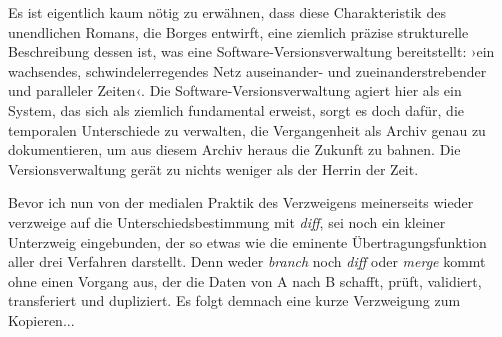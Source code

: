 \documentclass[a4paper,11pt]{article}
\newcommand{\inanf}[1]{›#1‹}
\begin{document}
Es ist eigentlich kaum nötig zu erwähnen, dass diese Charakteristik des unendlichen Romans, die Borges entwirft, eine ziemlich präzise strukturelle Beschreibung dessen ist, was eine Software-Versionsverwaltung bereitstellt: \inanf{ein wachsendes, schwindelerregendes Netz auseinander- und zueinanderstrebender und paralleler Zeiten}. Die Software-Versionsverwaltung agiert hier als ein System, das sich als ziemlich fundamental erweist, sorgt es doch dafür, die temporalen Unterschiede zu verwalten, die Vergangenheit als Archiv genau zu dokumentieren, um aus diesem Archiv heraus die Zukunft zu bahnen. Die Versionsverwaltung gerät zu nichts weniger als der Herrin der Zeit.

Bevor ich nun von der medialen Praktik des Verzweigens meinerseits wieder verzweige auf die Unterschiedsbestimmung mit \emph{diff}, sei noch ein kleiner Unterzweig eingebunden, der so etwas wie die eminente Übertragungsfunktion aller drei Verfahren darstellt. Denn weder \emph{branch} noch \emph{diff} oder \emph{merge} kommt ohne einen Vorgang aus, der die Daten von A nach B schafft, prüft, validiert, transferiert und dupliziert. Es folgt demnach eine kurze Verzweigung zum Kopieren... 
\end{document}
